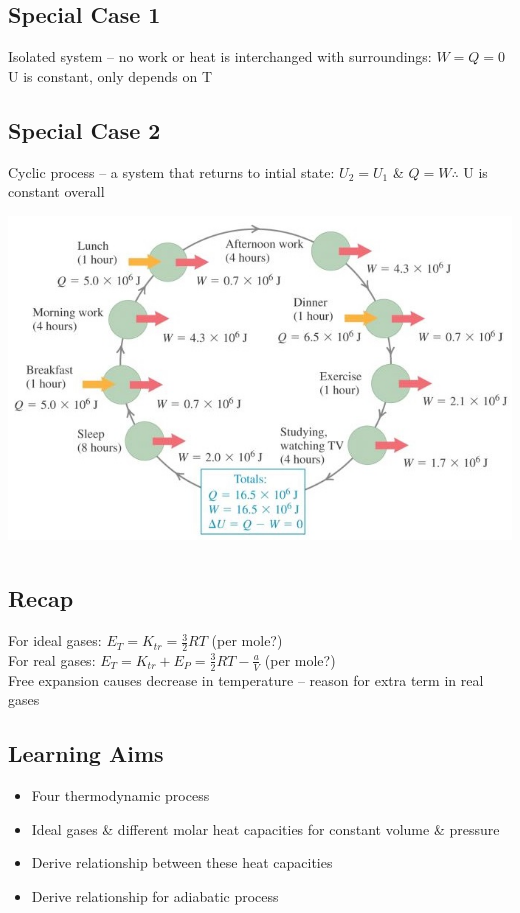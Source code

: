\documentclass[a4paper, 11pt, normalem]{report}
\begin{document}
\section{Special Case 1}
Isolated system -- no work or heat is interchanged with surroundings: $W = Q = 0$ \\
U is constant, only depends on T

\section{Special Case 2}
Cyclic process -- a system that returns to intial state: $U_{2} = U_{1}$ \& $Q = W \therefore$ U is constant overall

\includegraphics[scale=0.9]{Cyclic.jpg}

\chapter{}
\thispagestyle{fancy}
\section{Recap}
For ideal gases: $E_{T} = K_{tr} = \frac{3}{2}RT$ (per mole?) \\
For real gases: $E_{T} = K_{tr} + E_{P} = \frac{3}{2}RT - \frac{a}{V}$ (per mole?) \\
Free expansion causes decrease in temperature -- reason for extra term in real gases

\section{Learning Aims}
\begin{itemize}
	\item Four thermodynamic process
	\item Ideal gases \&  different molar heat capacities for constant volume \& pressure
	\item Derive relationship between these heat capacities
	\item Derive relationship for adiabatic process
\end{itemize}
\end{document}
